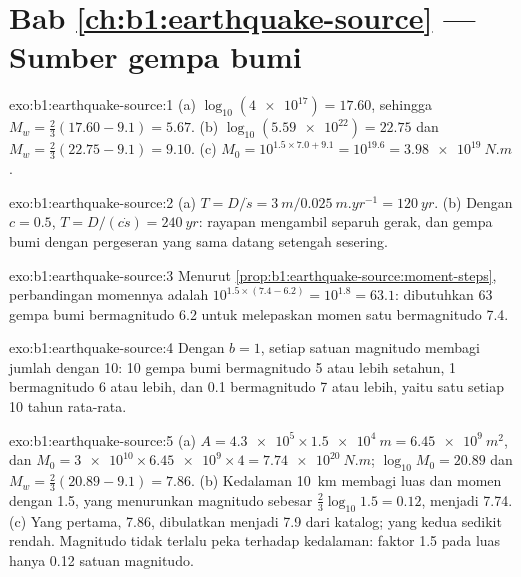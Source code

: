 \section*{Bab \ref{ch:b1:earthquake-source} --- Sumber gempa bumi}

\begin{solution}{exo:b1:earthquake-source:1}
(a) $\log_{10}(\num{4e17}) = 17.60$, sehingga $M_w = \tfrac23(17.60 - 9.1) = 5.67$.
(b) $\log_{10}(\num{5.59e22}) = 22.75$ dan $M_w = \tfrac23(22.75 - 9.1) =
9.10$. (c) $M_0 = 10^{1.5\times7.0 + 9.1} = 10^{19.6} = \qty{3.98e19}{N.m}$.
\end{solution}

\begin{solution}{exo:b1:earthquake-source:2}
(a) $T = D/\dot s = \qty{3}{m}/\qty{0.025}{m.yr^{-1}} = \qty{120}{yr}$.
(b) Dengan $c = 0.5$, $T = D/(c\dot s) = \qty{240}{yr}$: rayapan mengambil separuh gerak, dan gempa bumi dengan pergeseran yang sama datang setengah sesering.
\end{solution}

\begin{solution}{exo:b1:earthquake-source:3}
Menurut \cref{prop:b1:earthquake-source:moment-steps}, perbandingan momennya adalah
$10^{1.5\times(7.4 - 6.2)} = 10^{1.8} = 63.1$: dibutuhkan 63 gempa bumi bermagnitudo 6.2 untuk melepaskan momen satu bermagnitudo 7.4.
\end{solution}

\begin{solution}{exo:b1:earthquake-source:4}
Dengan $b = 1$, setiap satuan magnitudo membagi jumlah dengan 10: 10 gempa bumi bermagnitudo 5 atau lebih setahun, 1 bermagnitudo 6 atau lebih, dan 0.1 bermagnitudo 7 atau lebih, yaitu satu setiap 10 tahun rata-rata.
\end{solution}

\begin{solution}{exo:b1:earthquake-source:5}
(a) $A = \num{4.3e5} \times \qty{1.5e4}{m} = \qty{6.45e9}{m^2}$, dan
$M_0 = \num{3e10}\times\num{6.45e9}\times4 = \qty{7.74e20}{N.m}$;
$\log_{10}M_0 = 20.89$ dan $M_w = \tfrac23(20.89 - 9.1) = 7.86$. (b) Kedalaman
\qty{10}{km} membagi luas dan momen dengan 1.5, yang menurunkan magnitudo sebesar
$\tfrac23\log_{10}1.5 = 0.12$, menjadi 7.74. (c) Yang pertama, 7.86, dibulatkan menjadi
7.9 dari katalog; yang kedua sedikit rendah. Magnitudo tidak terlalu peka terhadap kedalaman: faktor 1.5 pada luas hanya 0.12 satuan magnitudo.
\end{solution}

